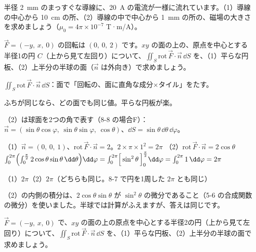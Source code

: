 \begin{jibun}
半径 \qty{2}{mm} のまっすぐな導線に、\qty{20}{A} の電流が一様に流れています。（1）導線の中心から \qty{10}{cm} の所、（2）導線の中で中心から \qty{1}{mm} の所の、磁場の大きさを求めましょう（$\mu_0=4\pi\times10^{-7}$ T·m/A）。
\end{jibun}

\begin{reidai}[面の選び方を変えても同じ]
$\vec F=(-y,\ x,\ 0)$ の回転は $(0,\ 0,\ 2)$ です。$xy$ の面の上の、原点を中心とする半径1の円 $C$（上から見て左回り）について、$\iint_S\mathrm{rot}\,\vec F\cdot\vec n\,\dd S$ を、（1）平らな円板、（2）上半分の半球の面（$\vec n$ は外向き）で求めましょう。\par
\kangaekata {}\par
{}\enspace $\iint_S\mathrm{rot}\,\vec F\cdot\vec n\,\dd S$：面で「回転の、面に直角な成分×タイル」をたす。\par
{}\enspace ふちが同じなら、どの面でも同じ値。平らな円板が楽。\par
{}\enspace（2）は球面を2つの角で表す（8-8 の場合F）：$\vec n=(\sin\theta\cos\varphi,\ \sin\theta\sin\varphi,\ \cos\theta)$、$\dd S=\sin\theta\,\dd\theta\,\dd\varphi$。\par
\shiki（1）$\vec n=(0,\ 0,\ 1)$、$\mathrm{rot}\,\vec F\cdot\vec n=2$。$2\times\pi\times1^2=2\pi$\kviiilq
（2）$\mathrm{rot}\,\vec F\cdot\vec n=2\cos\theta$\kviiilq
$\int_0^{2\pi}\Bigl(\int_0^{\frac{\pi}{2}}2\cos\theta\sin\theta\,\dd\theta\Bigr)\dd\varphi=\int_0^{2\pi}\Bigl[\,\sin^2\theta\,\Bigr]_0^{\frac{\pi}{2}}\dd\varphi=\int_0^{2\pi}1\,\dd\varphi=2\pi$\par
\kotae（1）\nobreak $2\pi$\quad（2）\nobreak $2\pi$（どちらも同じ。8-7 で円を1周した $2\pi$ とも同じ）
\end{reidai}
\noindent（2）の内側の積分は、$2\cos\theta\sin\theta$ が $\sin^2\theta$ の微分であること（5-6 の合成関数の微分）を使いました。半球では計算がふえますが、答えは同じです。

\begin{jibun}
$\vec F=(-y,\ x,\ 0)$ で、$xy$ の面の上の原点を中心とする半径2の円（上から見て左回り）について、$\iint_S\mathrm{rot}\,\vec F\cdot\vec n\,\dd S$ を、（1）平らな円板、（2）上半分の半球の面で求めましょう。
\end{jibun}

